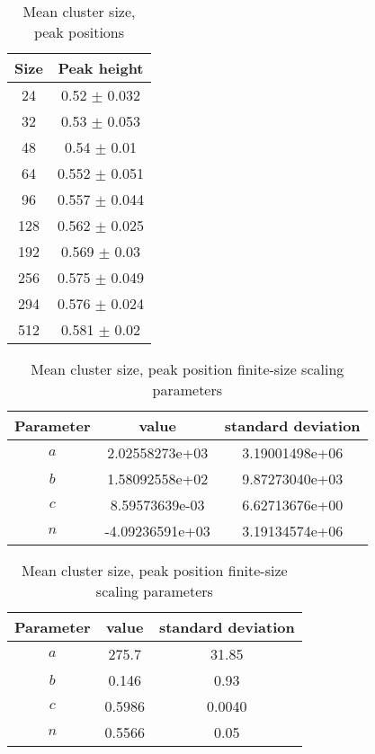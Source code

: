 \begin{table}[H]
\begin{center}
    \begin{tabular}{||c | c|| }
    \hline
       Size & Peak height     \\
    \hline
         24 & 0.52 $\pm$ 0.032  \\
         32 & 0.53 $\pm$ 0.053  \\
         48 & 0.54 $\pm$ 0.01   \\
         64 & 0.552 $\pm$ 0.051 \\
         96 & 0.557 $\pm$ 0.044 \\
        128 & 0.562 $\pm$ 0.025 \\
        192 & 0.569 $\pm$ 0.03  \\
        256 & 0.575 $\pm$ 0.049 \\
        294 & 0.576 $\pm$ 0.024 \\
        512 & 0.581 $\pm$ 0.02  \\
    \hline
    \end{tabular}
\end{center}
\caption{Mean cluster size, peak positions}
\label{table:pp_mean_cluster_size_peak_positions}
\end{table}


\begin{table}[H]
\begin{center}
    \begin{tabular}{||c | c c|| }
    \hline
      Parameter &  value & standard deviation \\
    \hline
      $a$ &    2.02558273e+03  &  3.19001498e+06 \\
      $b$ &    1.58092558e+02 &  9.87273040e+03 \\
      $c$ & 8.59573639e-03 & 6.62713676e+00  \\
      $n$ & -4.09236591e+03 & 3.19134574e+06 \\
    \hline
    \end{tabular}
\end{center}
\caption{Mean cluster size, peak position finite-size scaling parameters}
\label{table:pp_mean_cluster_size_peak_height_finite_size_scaling_params}
\end{table}


\begin{table}[H]
\begin{center}
    \begin{tabular}{||c | c c|| }
    \hline
      Parameter &  value & standard deviation \\
    \hline
      $a$ &    275.7  &  31.85 \\
      $b$ &    0.146 &  0.93 \\
      $c$ & 0.5986 & 0.0040 \\
      $n$ & 0.5566 & 0.05 \\
    \hline
    \end{tabular}
\end{center}
\caption{Mean cluster size, peak position finite-size scaling parameters}
\label{table:pp_mean_cluster_size_peak_position_finite_size_scaling_params}
\end{table}


